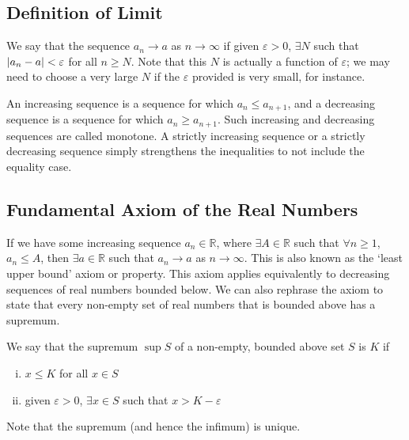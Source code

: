 \subsection{Definition of Limit}
\begin{definition}
	We say that the sequence \(a_n \to a\) as \(n \to \infty\) if given \(\varepsilon > 0\), \(\exists N\) such that \(\abs{a_n - a} < \varepsilon\) for all \(n \geq N\).
	Note that this \(N\) is actually a function of \(\varepsilon\); we may need to choose a very large \(N\) if the \(\varepsilon\) provided is very small, for instance.
\end{definition}
\begin{definition}
	An increasing sequence is a sequence for which \(a_n \leq a_{n+1}\), and a decreasing sequence is a sequence for which \(a_n \geq a_{n+1}\).
	Such increasing and decreasing sequences are called monotone.
	A strictly increasing sequence or a strictly decreasing sequence simply strengthens the inequalities to not include the equality case.
\end{definition}

\subsection{Fundamental Axiom of the Real Numbers}
If we have some increasing sequence \(a_n \in \mathbb R\), where \(\exists A \in \mathbb R\) such that \(\forall n \geq 1\), \(a_n \leq A\), then \(\exists a \in \mathbb R\) such that \(a_n \to a\) as \(n \to \infty\).
This is also known as the `least upper bound' axiom or property.
This axiom applies equivalently to decreasing sequences of real numbers bounded below.
We can also rephrase the axiom to state that every non-empty set of real numbers that is bounded above has a supremum.
\begin{definition}
	We say that the supremum \(\sup S\) of a non-empty, bounded above set \(S\) is \(K\) if
	\begin{enumerate}[(i)]
		\item \(x \leq K\) for all \(x \in S\)
		\item given \(\varepsilon > 0\), \(\exists x \in S\) such that \(x > K - \varepsilon\)
	\end{enumerate}
\end{definition}
Note that the supremum (and hence the infimum) is unique.


